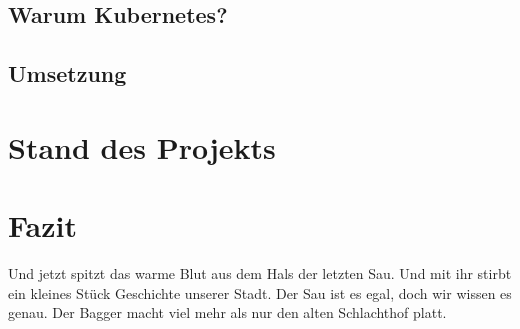 \documentclass[12pt,a4paper]{scrartcl}
\begin{document}
\subsection{Warum Kubernetes?} 

\subsection{Umsetzung}

\section{Stand des Projekts} \label{project_status}

\section{Fazit}\label{conclusion}
Und jetzt spitzt das warme Blut aus dem Hals der letzten Sau. Und mit ihr stirbt ein kleines Stück Geschichte unserer Stadt. Der Sau ist es egal, doch wir wissen es genau. Der Bagger macht viel mehr als nur den alten Schlachthof platt. 

\newpage


\printbibliography
{}
\end{document}
